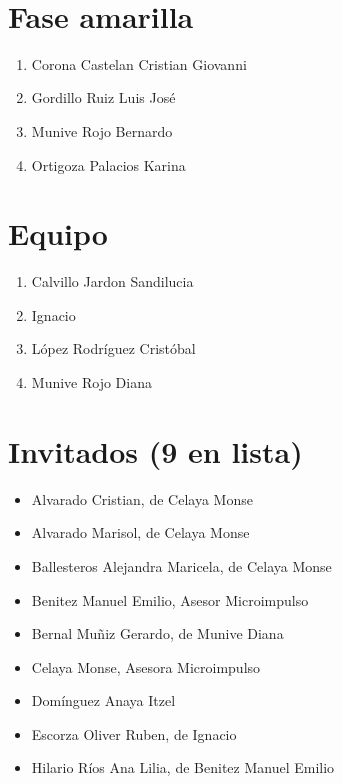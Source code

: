 

\begin{spacing}{0.5}
\ \\ 
\justifying
\begin{paracol}{2}
\section*{Fase amarilla}
\begin{enumerate}
\item Corona  Castelan  Cristian  Giovanni  
\item Gordillo  Ruiz  Luis  José  
\item Munive  Rojo  Bernardo  
\item Ortigoza  Palacios  Karina  
\end{enumerate}
\switchcolumn
\section*{Equipo}
\begin{enumerate}
\item Calvillo  Jardon  Sandilucia  
\item Ignacio  
\item López  Rodríguez  Cristóbal  
\item Munive  Rojo  Diana  
\end{enumerate}
\end{paracol}
\section*{Invitados (9 en lista)}
\begin{paracol}{2}
\begin{itemize}
\item Alvarado  Cristian,  de Celaya  Monse  
\item Alvarado  Marisol,  de Celaya  Monse  
\item Ballesteros  Alejandra  Maricela,  de Celaya  Monse  
\item Benitez  Manuel  Emilio,  Asesor  Microimpulso  
\item Bernal  Muñiz  Gerardo,  de Munive  Diana  
\item Celaya  Monse,  Asesora  Microimpulso  
\item Domínguez  Anaya  Itzel  
\item Escorza  Oliver  Ruben,  de Ignacio  
\item Hilario  Ríos  Ana  Lilia,  de Benitez  Manuel  Emilio  
\end{itemize}
\end{paracol}
\end{spacing}



